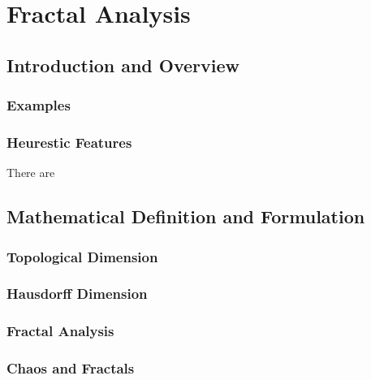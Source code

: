 
\chapter{Fractal Analysis} %

\label{Chapter4} %


\section{Introduction and Overview}

\subsection{Examples}

\subsection{Heurestic Features}
There are \cite{edgar}
\section{Mathematical Definition and Formulation}
\subsection{Topological Dimension}
\subsection{Hausdorff Dimension}
\subsection{Fractal Analysis}
\subsection{Chaos and Fractals}
